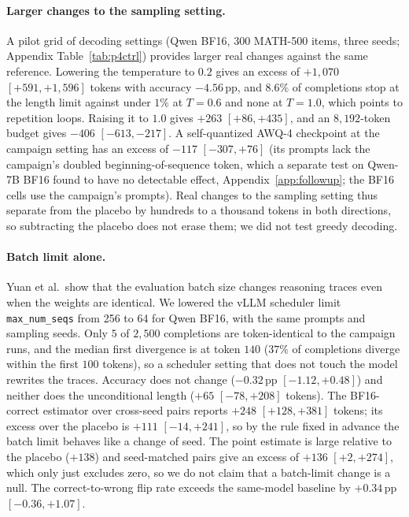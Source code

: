 \documentclass[11pt,a4paper]{article}
\begin{document}
\paragraph{Larger changes to the sampling setting.} A pilot grid of decoding settings (Qwen BF16, 300 MATH-500 items, three seeds; Appendix Table~\ref{tab:p4ctrl}) provides larger real changes against the same reference. Lowering the temperature to $0.2$ gives an excess of $+1{,}070$ $[+591,+1{,}596]$ tokens with accuracy $-4.56$\,pp, and $8.6\%$ of completions stop at the length limit against under $1\%$ at $T=0.6$ and none at $T=1.0$, which points to repetition loops. Raising it to $1.0$ gives $+263$ $[+86,+435]$, and an $8{,}192$-token budget gives $-406$ $[-613,-217]$. A self-quantized AWQ-4 checkpoint at the campaign setting has an excess of $-117$ $[-307,+76]$ (its prompts lack the campaign's doubled beginning-of-sequence token, which a separate test on Qwen-7B BF16 found to have no detectable effect, Appendix~\ref{app:followup}; the BF16 cells use the campaign's prompts). Real changes to the sampling setting thus separate from the placebo by hundreds to a thousand tokens in both directions, so subtracting the placebo does not erase them; we did not test greedy decoding.

\paragraph{Batch limit alone.} Yuan et al.\ show that the evaluation batch size changes reasoning traces even when the weights are identical. We lowered the vLLM scheduler limit \texttt{max\_num\_seqs} from 256 to 64 for Qwen BF16, with the same prompts and sampling seeds. Only $5$ of $2{,}500$ completions are token-identical to the campaign runs, and the median first divergence is at token $140$ ($37\%$ of completions diverge within the first $100$ tokens), so a scheduler setting that does not touch the model rewrites the traces. Accuracy does not change ($-0.32$\,pp $[-1.12,+0.48]$) and neither does the unconditional length ($+65$ $[-78,+208]$ tokens). The BF16-correct estimator over cross-seed pairs reports $+248$ $[+128,+381]$ tokens; its excess over the placebo is $+111$ $[-14,+241]$, so by the rule fixed in advance the batch limit behaves like a change of seed. The point estimate is large relative to the placebo ($+138$) and seed-matched pairs give an excess of $+136$ $[+2,+274]$, which only just excludes zero, so we do not claim that a batch-limit change is a null. The correct-to-wrong flip rate exceeds the same-model baseline by $+0.34$\,pp $[-0.36,+1.07]$.
\end{document}
